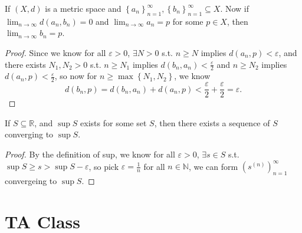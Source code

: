 \begin{theorem} \label{thm: two seq d converge to 0 implies converge to same point}
    If \((X, d)\) is a metric space and \(\left\{ a_n \right\}_{n=1}^{\infty} , \left\{ b_n \right\}_{n=1}^{\infty} \subseteq X  \). Now if \(\lim_{n \to \infty} d(a_n, b_n) = 0 \) and \(\lim_{n \to \infty} a_n = p \) for some \(p \in X\), then \(\lim_{n \to \infty} b_n = p \).      
\end{theorem}
\begin{proof}
    Since we know for all \(\varepsilon > 0\), \(\exists N > 0\) s.t. \(n \ge N\) implies \(d(a_n, p) < \varepsilon \), and there exists \(N_1, N_2 > 0\) s.t. \(n \ge N_1\) implies \(d(b_n, a_n) < \frac{\varepsilon}{2}\) and \(n \ge N_2\) implies \(d(a_n, p) < \frac{\varepsilon}{2}\), so now for \(n \ge \max \left\{ N_1, N_2 \right\} \), we know 
    \[
        d(b_n, p) = d(b_n, a_n) + d(a_n, p) < \frac{\varepsilon}{2} + \frac{\varepsilon}{2} =\varepsilon .
    \]          
\end{proof}

\begin{theorem} \label{thm: if sup exists then a sequence in S converges to supS}
    If \(S \subseteq \mathbb{R} \), and \(\sup S\) exists for some set \(S\), then there exists a sequence of \(S\) converging to \(\sup S\).    
\end{theorem}
\begin{proof}
    By the definition of sup, we know for all \(\varepsilon > 0\), \(\exists s \in S\) s.t. \(\sup S \ge s > \sup S - \varepsilon \), so pick \(\varepsilon = \frac{1}{n}\) for all \(n \in \mathbb{N} \), we can form \(\left( s^{(n)} \right)_{n=1}^{\infty}  \) convergeing to \(\sup S\).        
\end{proof}





\chapter{TA Class}